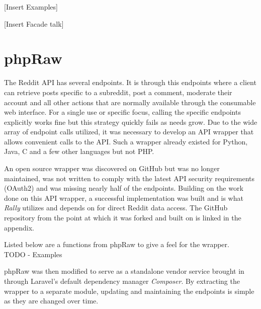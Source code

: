 \documentclass[msc,oneside]{ubcthesis}%
\begin{document}
[Insert Examples]

[Insert Facade talk]


\section{phpRaw}
The Reddit API has several endpoints. It is through this endpoints where a client can retrieve posts specific to a subreddit, post a comment, moderate their account and all other actions that are normally available through the consumable web interface. For a single use or specific focus, calling the specific endpoints explicitly works fine but this strategy quickly fails as needs grow. Due to the wide array of endpoint calls utilized, it was necessary to develop an API wrapper that allows convenient calls to the API. Such a wrapper already existed for Python, Java, C and a few other languages but not PHP.
\par
An open source wrapper was discovered on GitHub but was no longer maintained, was not written to comply with the latest API security requirements (OAuth2) and was missing nearly half of the endpoints. Building on the work done on this API wrapper, a successful implementation was built and is what \textit{Rally} utilizes and depends on for direct Reddit data access. The GitHub repository from the point at which it was forked and built on is linked in the appendix.
\par 
Listed below are a functions from phpRaw to give a feel for the wrapper.
\\
TODO - Examples
\par
phpRaw was then modified to serve as a standalone vendor service brought in through Laravel's default dependency manager \textit{Composer}. By extracting the wrapper to a separate module, updating and maintaining the endpoints is simple as they are changed over time.



\newpage %
\pagestyle{fancy}\rhead{}\cfoot{}\rfoot{\thepage}

%
\end{document}
